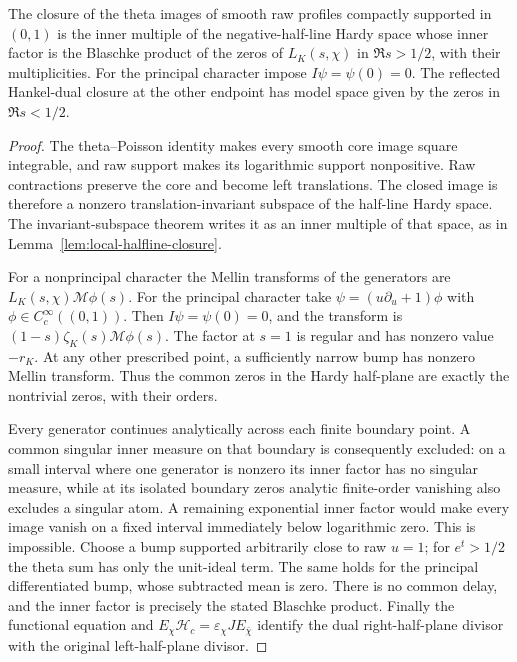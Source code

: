 \begin{lemma}
\label{lem:hecke-halfline-closure}
The closure of the theta images of smooth raw profiles compactly
supported in $(0,1)$ is the inner multiple of the negative-half-line
Hardy space whose inner factor is the Blaschke product of the zeros
of $L_K(s,\chi)$ in $\Re s>1/2$, with their multiplicities.
For the principal character impose $I\psi=\psi(0)=0$.
The reflected Hankel-dual closure at the other endpoint has model
space given by the zeros in $\Re s<1/2$.
\end{lemma}
\begin{proof}
The theta--Poisson identity makes every smooth core image square
integrable, and raw support makes its logarithmic support nonpositive.
Raw contractions preserve the core and become left translations.
The closed image is therefore a nonzero translation-invariant subspace
of the half-line Hardy space. The invariant-subspace theorem writes it
as an inner multiple of that space, as in
Lemma~\ref{lem:local-halfline-closure}.

For a nonprincipal character the Mellin transforms of the generators
are $L_K(s,\chi)\mathcal M\phi(s)$. For the principal character take
$\psi=(u\partial_u+1)\phi$ with $\phi\in C_c^\infty((0,1))$.
Then $I\psi=\psi(0)=0$, and the transform is
$(1-s)\zeta_K(s)\mathcal M\phi(s)$. The factor at $s=1$ is regular
and has nonzero value $-r_K$. At any other prescribed point, a
sufficiently narrow bump has nonzero Mellin transform. Thus the common
zeros in the Hardy half-plane are exactly the nontrivial zeros, with
their orders.

Every generator continues analytically across each finite boundary
point. A common singular inner measure on that boundary is consequently
excluded: on a small interval where one generator is nonzero its inner
factor has no singular measure, while at its isolated boundary zeros
analytic finite-order vanishing also excludes a singular atom.
A remaining exponential inner factor would make every image vanish on
a fixed interval immediately below logarithmic zero. This is impossible.
Choose a bump supported arbitrarily close to raw $u=1$; for $e^t>1/2$
the theta sum has only the unit-ideal term. The same holds for the
principal differentiated bump, whose subtracted mean is zero.
There is no common delay, and the inner factor is precisely the stated
Blaschke product. Finally the functional equation and
$E_\chi\mathcal H_c=\varepsilon_\chi J E_{\bar\chi}$ identify the
dual right-half-plane divisor with the original left-half-plane divisor.
\end{proof}


